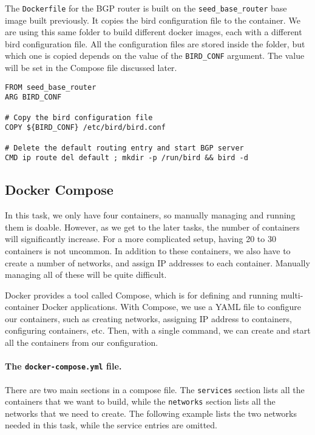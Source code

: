 The \texttt{Dockerfile} for the BGP router is built 
on the \texttt{seed\_base\_router} base image built previously.  
It copies the bird configuration file to the container.
We are using this same folder to build different 
docker images, each with a different bird configuration file.
All the configuration files are stored inside the folder,
but which one is copied depends on the value 
of the \texttt{BIRD\_CONF} argument. The value will be set 
in the Compose file discussed later.  

\begin{lstlisting}
FROM seed_base_router
ARG BIRD_CONF

# Copy the bird configuration file
COPY ${BIRD_CONF} /etc/bird/bird.conf

# Delete the default routing entry and start BGP server
CMD ip route del default ; mkdir -p /run/bird && bird -d
\end{lstlisting}


\subsection{Docker Compose} 

In this task, we only have four containers, so manually
managing and running them is doable. However, as we 
get to the later tasks, the number of containers will
significantly increase. For a more complicated
setup, having 20 to 30 containers is not uncommon. 
In addition to these containers, we also have to create 
a number of networks, and assign IP addresses to each container.
Manually managing all of these will be quite difficult.

Docker provides a tool called Compose, which
is for defining and running multi-container Docker applications.
With Compose, we use a YAML file to configure our containers, such as
creating networks, assigning IP address to containers, 
configuring containers, etc. 
Then, with a single command,
we can create and start all the containers from our configuration.


\paragraph{The \texttt{docker-compose.yml} file.}
There are two main sections in a compose file. 
The \texttt{services} section lists all the 
containers that we want to build, while  
the \texttt{networks} section lists 
all the networks that we need to create. 
The following example lists the two
networks needed in this task, while the service entries are 
omitted. 

